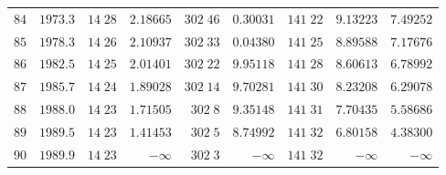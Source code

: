 \begin{center}
\begin{tabular}{r|r|r|r|r|r|r|r|r}
$84$&$1973.3$&$14\;28$&$2.18665$&$302\;46$&$0.30031$&$141\;22$&$9.13223$&$7.49252$\\[2pt]
$85$&$1978.3$&$14\;26$&$2.10937$&$302\;33$&$0.04380$&$141\;25$&$8.89588$&$7.17676$\\
$86$&$1982.5$&$14\;25$&$2.01401$&$302\;22$&$9.95118$&$141\;28$&$8.60613$&$6.78992$\\
$87$&$1985.7$&$14\;24$&$1.89028$&$302\;14$&$9.70281$&$141\;30$&$8.23208$&$6.29078$\\
$88$&$1988.0$&$14\;23$&$1.71505$&$302\;8$&$9.35148$&$141\;31$&$7.70435$&$5.58686$\\
$89$&$1989.5$&$14\;23$&$1.41453$&$302\;5$&$8.74992$&$141\;32$&$6.80158$&$4.38300$\\[2pt]
$90$&$1989.9$&$14\;23$&$-\infty$&$302\;3$&$-\infty$&$141\;32$&$-\infty$&$-\infty$\\
\hline
\end{tabular}
\end{center}
\endgroup
